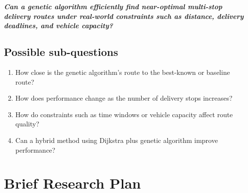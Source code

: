 \documentclass[11pt,a4paper]{article}
\begin{document}
\noindent\textit{\textbf{Can a genetic algorithm efficiently find near-optimal multi-stop delivery routes under real-world constraints such as distance, delivery deadlines, and vehicle capacity?}}

\subsection*{Possible sub-questions}
\begin{enumerate}
    \item How close is the genetic algorithm's route to the best-known or baseline route?
    \item How does performance change as the number of delivery stops increases?
    \item How do constraints such as time windows or vehicle capacity affect route quality?
    \item Can a hybrid method using Dijkstra plus genetic algorithm improve performance?
\end{enumerate}

\section{Brief Research Plan}
\end{document}

